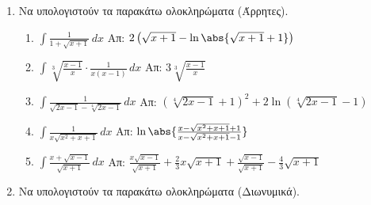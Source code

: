 


\everymath{\displaystyle}
\thispagestyle{empty}



\begin{center}
\end{center}

\vspace{\baselineskip}

\begin{enumerate}
	\item Να υπολογιστούν τα παρακάτω ολοκληρώματα (Άρρητες).
		
		\begin{enumerate}
			\item $ \int \frac{1}{1 + \sqrt{x+1}} \,{dx} $ \hfill Απ: $
				2\left(\sqrt{x+1} - \ln{\abs{\sqrt{x+1} + 1}}\right) $
		\item $ \int \sqrt[3]{\frac{x-1}{x}} \cdot \frac{1}{x(x-1)} \,{dx} $
				\hfill Απ: $ 3 \sqrt[3]{\frac{x-1}{x}} $
			\item $ \int \frac{1}{\sqrt{2x-1} - \sqrt[4]{2x-1}} \,{dx} $ \hfill
				Απ:	$ \left(\sqrt[4]{2x-1} + 1\right)^{2} + 2 \ln{\left(\sqrt[4]{2x-1} - 1\right)} $
			\item $ \int \frac{1}{x \sqrt{x^{2}+x+1}} \,{dx} $ \hfill Απ: $
				\ln{\abs{\frac{x - \sqrt{x^{2}+x+1} +1}{x - \sqrt{x^{2}+x+1} -1}}} $
			\item $ \int \frac{x + \sqrt{x-1}}{\sqrt{x+1}} \,{dx} $ \hfill Απ: $
				\frac{x \sqrt{x-1}}{\sqrt{x+1}} + \frac{2}{3} x \sqrt{x+1} +
		\frac{\sqrt{x-1}}{\sqrt{x+1}} - \frac{4}{3} \sqrt{x+1}  $
		\end{enumerate}

	\item Να υπολογιστούν τα παρακάτω ολοκληρώματα (Διωνυμικά).


\end{enumerate}
